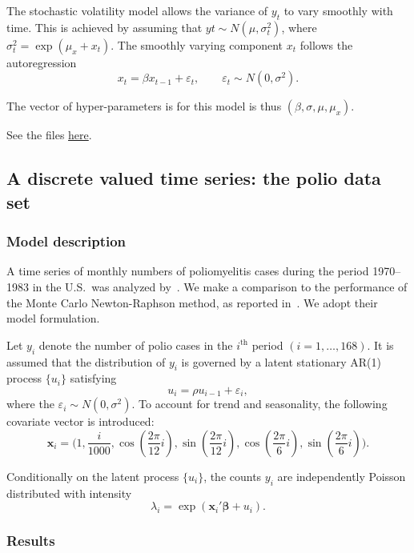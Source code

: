 \documentclass{admbmanual}
\newcommand{\citeasnoun}{\cite}
\begin{document}
The stochastic volatility model allows the variance of $y_t$ to vary smoothly
with time. This is achieved by assuming that $yt\sim N(\mu,\sigma_t^2)$, where
$\sigma_t^2=\exp(\mu_x+x_t)$. The smoothly varying component $x_t$ follows the
autoregression
\[
x_t = \beta x_{t-1} + \varepsilon_t, \qquad \varepsilon_t \sim N(0,\sigma^2).
\]

The vector of hyper-parameters is for this model is thus
$(\beta,\sigma,\mu,\mu_x)$.

See the files \href{http://www.admb-project.org/otter-research/admbre/examples/sdv/sdv.html}{here}.

\subsection{A discrete valued time series: the polio data set}
\label{sec:sdv_example}

\subsubsection{Model description}

A time series of monthly numbers of poliomyelitis cases during the period
1970--1983 in the U.S.\ was analyzed by~\citeasnoun{zege:1988}. We make a
comparison to the performance of the Monte Carlo Newton-Raphson method, as
reported in~\citeasnoun{kuk:chen:1999}. We adopt their model formulation.

Let $y_i$ denote the number of polio cases in the $i^{\textrm{th}}$ period
$(i=1,\ldots,168)$. It is assumed that the distribution of $y_i$ is governed
by a latent stationary AR(1) process $\{u_i\}$ satisfying
\[
u_i = \rho u_{i-1} + \varepsilon_i,
\]
where the $\varepsilon_i\sim N(0,\sigma^2)$. %
To account for trend and seasonality, the following covariate vector is
introduced:
\[
\mathbf{x}_i = \Bigg(
1,
\frac{i}{1000},
\cos\left(\frac{2\pi}{12}i\right),
\sin\left(\frac{2\pi}{12}i\right),
\cos\left(\frac{2\pi}{6}i\right),
\sin\left(\frac{2\pi}{6}i\right)
\Bigg).
\]

Conditionally on the latent process $\{u_i\}$, the counts $y_i$ are
independently Poisson distributed with intensity
\[
\lambda_i=\exp(\mathbf{x}_i{}'\mathbf{\beta}+u_i).
\]

\subsubsection{Results}
\end{document}
